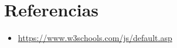 \documentclass{article}
\begin{document}
	\section{Referencias}
	\begin{itemize}			
		\item \url{https://www.w3schools.com/js/default.asp}
	\end{itemize}	
	
	
\end{document}
